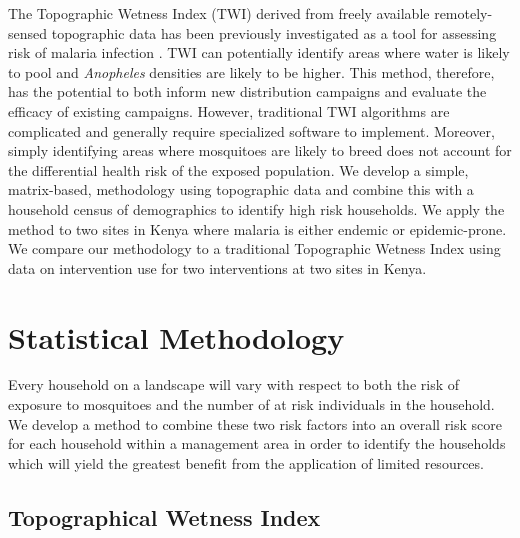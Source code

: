 \documentclass{article}\usepackage[]{graphicx}\usepackage[]{color}
\begin{document}
The Topographic Wetness Index (TWI) \cite{Beven1979} derived from freely available remotely-sensed topographic data has been previously investigated as a tool for assessing risk of malaria infection \cite{Cohen2008,Cohen2010}. TWI can potentially identify areas where water is likely to pool and \emph{Anopheles} densities are likely to be higher. This method, therefore, has the potential to both inform new distribution campaigns and evaluate the efficacy of existing campaigns.  However, traditional TWI algorithms are complicated and generally require specialized software to implement.  Moreover, simply identifying areas where mosquitoes are likely to breed does not account for the differential health risk of the exposed population.  We develop a simple, matrix-based, methodology using topographic data and combine this with a household census of demographics to identify high risk households.  We apply the method to two sites in Kenya where malaria is either endemic or epidemic-prone.  We compare our methodology to a traditional Topographic  Wetness Index using data on intervention use for two interventions at two sites in Kenya. \\%



\section{Statistical Methodology}%
Every household on a landscape will vary with respect to both the risk of exposure to mosquitoes and the number of at risk individuals in the household. We develop a method to combine these two risk factors into an overall risk score for each household within a management area in order to identify the households which will yield the greatest benefit from the application of limited resources.\\

\subsection{Topographical Wetness Index}
\end{document}
